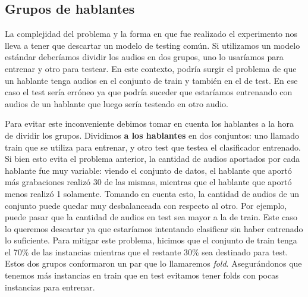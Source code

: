 
\subsection{Grupos de hablantes}
\label{grupo_de_hablantes}


La complejidad del problema y la forma en que fue realizado el experimento nos lleva a tener que descartar un modelo de testing común. Si utilizamos un modelo estándar deberíamos dividir los audios en dos grupos, uno lo usaríamos para entrenar y otro para testear. En este contexto, podría surgir el problema de que un hablante tenga audios en el conjunto de train y también en el de test. En ese caso el test sería erróneo ya que podría suceder que estaríamos entrenando con audios de un hablante que luego sería testeado en otro audio.

Para evitar este inconveniente debimos tomar en cuenta los hablantes a la hora de dividir los grupos. Dividimos \textbf{a los hablantes} en dos conjuntos: uno llamado train que se utiliza para entrenar, y otro test que testea el clasificador entrenado. Si bien esto evita el problema anterior, la cantidad de audios aportados por cada hablante fue muy variable: viendo el conjunto de datos, el hablante que aportó más grabaciones realizó 30 de las mismas, mientras que el hablante que aportó menos realizó 1 solamente. Tomando en cuenta esto, la cantidad de audios de un conjunto puede quedar muy desbalanceada con respecto al otro. Por ejemplo, puede pasar que la cantidad de audios en test sea mayor a la de train. Este caso lo queremos descartar ya que estaríamos intentando clasificar sin haber entrenado lo suficiente. Para mitigar este problema, hicimos que el conjunto de train tenga el 70\% de las instancias mientras que el restante 30\% sea destinado para test. Estos dos grupos conformaron un par que lo llamaremos \textit{fold}. Asegurándonos que tenemos más instancias en train que en test evitamos tener folds con pocas instancias para entrenar.

